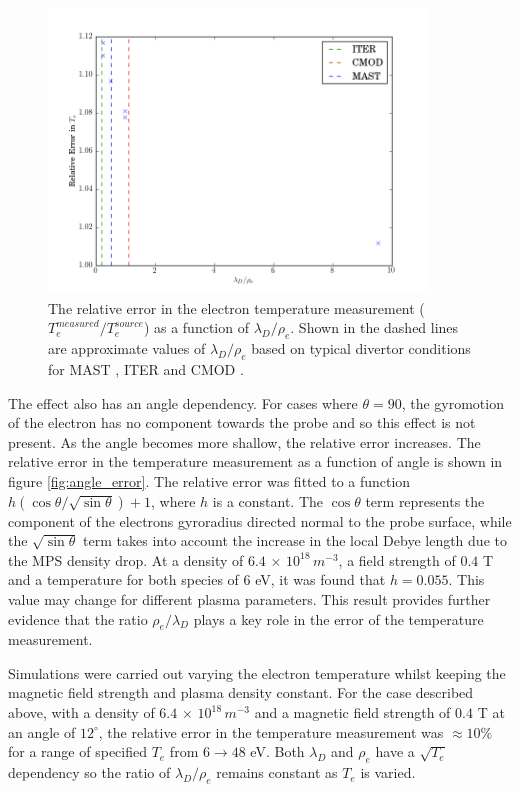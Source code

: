 \begin{figure}[H]
	\centering
	\includegraphics[width=0.9\textwidth]{relative_error.pdf}
	\caption{The relative error in the electron temperature measurement ($T_e^{measured} / T_e ^{source}$) as a function of $\lambda_D / \rho_e$. Shown in the dashed lines are approximate values of $\lambda_D / \rho_e$ based on typical divertor conditions for MAST \cite{MAST_DIV}, ITER \cite{ITER} and CMOD \cite{CMOD_DIV}. }
	\label{fig:relative_error}
\end{figure}

The effect also has an angle dependency. For cases where $\theta = 90$, the gyromotion of the electron has no component towards the probe and so this effect is not present. As the angle becomes more shallow, the relative error increases. The relative error in the temperature measurement as a function of angle is shown in figure \ref{fig:angle_error}. The relative error was fitted to a function  $h(\cos\theta / \sqrt{\sin\theta})+1$, where $h$ is a constant. The $\cos \theta$ term represents the component of the electrons gyroradius directed normal to the probe surface, while the $\sqrt{\sin \theta}$ term takes into account the increase in the local Debye length due to the MPS density drop. At a density of $6.4 \, \times \, 10^{18} \, m^{-3}$, a field strength of $0.4$ T and a temperature for both species of $6$ eV, it was found that $h = 0.055$. This value may change for different plasma parameters. This result provides further evidence that the ratio $\rho_e / \lambda_D$ plays a key role in the error of the temperature measurement.


Simulations were carried out varying the electron temperature whilst keeping the magnetic field strength and plasma density constant. For the case described above, with a density of $ 6.4 \, \times \, 10^{18} \, m^{-3}$ and a magnetic field strength of $0.4$ T at an angle of $12^{\circ}$, the relative error in the temperature measurement was $\approx 10\%$ for a range of specified $T_e$ from $6 \to 48$ eV. Both $\lambda_D$ and $\rho_e$ have a $\sqrt{T_e}$ dependency so the ratio of $\lambda_D / \rho_e$ remains constant as $T_e$ is varied.

